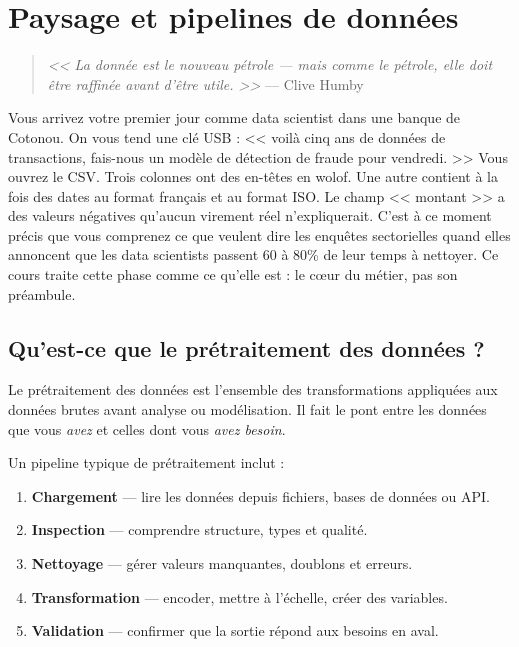 \chapter{Paysage et pipelines de donn\'ees}
\label{ch:data-landscape}

\begin{quote}
\emph{<< La donn\'ee est le nouveau p\'etrole --- mais comme le p\'etrole, elle doit \^etre raffin\'ee avant d'\^etre utile. >>}
--- Clive Humby
\end{quote}

Vous arrivez votre premier jour comme data scientist dans une banque de Cotonou. On vous tend une clé USB : << voilà cinq ans de données de transactions, fais-nous un modèle de détection de fraude pour vendredi. >> Vous ouvrez le CSV. Trois colonnes ont des en-têtes en wolof. Une autre contient à la fois des dates au format français et au format ISO. Le champ << montant >> a des valeurs négatives qu'aucun virement réel n'expliquerait. C'est à ce moment précis que vous comprenez ce que veulent dire les enquêtes sectorielles quand elles annoncent que les data scientists passent 60 à 80\% de leur temps à nettoyer. Ce cours traite cette phase comme ce qu'elle est : le cœur du métier, pas son préambule.
\section{Qu'est-ce que le pr\'etraitement des donn\'ees ?}

Le pr\'etraitement des donn\'ees est l'ensemble des transformations appliqu\'ees aux donn\'ees brutes avant analyse ou mod\'elisation. Il fait le pont entre les donn\'ees que vous \emph{avez} et celles dont vous \emph{avez besoin}.

Un pipeline typique de pr\'etraitement inclut :
\begin{enumerate}
  \item \textbf{Chargement} --- lire les donn\'ees depuis fichiers, bases de donn\'ees ou API.
  \item \textbf{Inspection} --- comprendre structure, types et qualit\'e.
  \item \textbf{Nettoyage} --- g\'erer valeurs manquantes, doublons et erreurs.
  \item \textbf{Transformation} --- encoder, mettre \`a l'\'echelle, cr\'eer des variables.
  \item \textbf{Validation} --- confirmer que la sortie r\'epond aux besoins en aval.
\end{enumerate}


